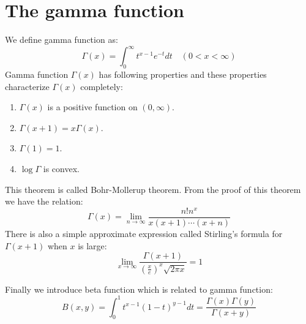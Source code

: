 \section{The gamma function}
We define gamma function as:
\begin{equation*}
    \Gamma(x)=\int_{0}^{\infty}t^{x-1}e^{-t}dt\quad (0<x<\infty)
\end{equation*}
Gamma function $\Gamma(x)$ has following properties and these properties characterize $\Gamma(x)$ completely:
\begin{enumerate}
    \item $\Gamma(x)$ is a positive function on $(0,\infty)$.
    \item $\Gamma(x+1)=x\Gamma(x)$.
    \item $\Gamma(1)=1$.
    \item $\log\Gamma$ is convex.
\end{enumerate}
This theorem is called Bohr-Mollerup theorem. From the proof of this theorem we have the relation:
\begin{equation*}
    \Gamma(x)=\lim_{n\to\infty}\frac{n!n^x}{x(x+1)\cdots(x+n)}
\end{equation*}
There is also a simple approximate expression called Stirling's formula for $\Gamma(x+1)$ when $x$ is large:
\begin{equation*}
    \lim_{x\to\infty}\frac{\Gamma(x+1)}{(\frac{x}{e})^x\sqrt{2\pi x}}=1
\end{equation*}\par
Finally we introduce beta function which is related to gamma function:
\begin{equation*}
    B(x,y)=\int_{0}^{1}t^{x-1}(1-t)^{y-1}dt=\frac{\Gamma(x)\Gamma(y)}{\Gamma(x+y)}
\end{equation*}
